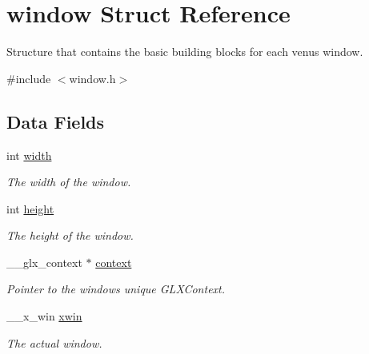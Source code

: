 \hypertarget{structwindow}{}\section{window Struct Reference}
\label{structwindow}


Structure that contains the basic building blocks for each venus window.  




{\ttfamily \#include $<$window.\+h$>$}

\subsection*{Data Fields}
\begin{DoxyCompactItemize}
\item 
\mbox{\label{structwindow_a6d1d235e4e25a3ffee451f880ff3d936}} 
int \hyperlink{structwindow_a6d1d235e4e25a3ffee451f880ff3d936}{width}
\begin{DoxyCompactList}\small\item\em The width of the window. \end{DoxyCompactList}\item 
\mbox{\label{structwindow_a3fbcf84b22b22fff0eb213414871aad9}} 
int \hyperlink{structwindow_a3fbcf84b22b22fff0eb213414871aad9}{height}
\begin{DoxyCompactList}\small\item\em The height of the window. \end{DoxyCompactList}\item 
\mbox{\label{structwindow_a90eff798620fee3c37913a2a50f1c2a8}} 
\+\_\+\+\_\+glx\+\_\+context $\ast$ \hyperlink{structwindow_a90eff798620fee3c37913a2a50f1c2a8}{context}
\begin{DoxyCompactList}\small\item\em Pointer to the window\textquotesingle{}s unique G\+L\+X\+Context. \end{DoxyCompactList}\item 
\mbox{\label{structwindow_a23ff6e8e3c92fbe719eac958c837303d}} 
\+\_\+\+\_\+x\+\_\+win \hyperlink{structwindow_a23ff6e8e3c92fbe719eac958c837303d}{xwin}
\begin{DoxyCompactList}\small\item\em The actual window. \end{DoxyCompactList}\end{DoxyCompactItemize}


